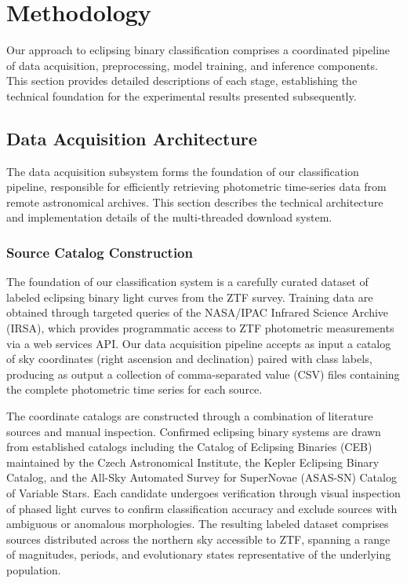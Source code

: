 \documentclass[11pt,a4paper]{article}
\begin{document}
\section{Methodology}\label{sec:methodology}

Our approach to eclipsing binary classification comprises a coordinated pipeline of data acquisition, preprocessing, model training, and inference components. This section provides detailed descriptions of each stage, establishing the technical foundation for the experimental results presented subsequently.

\subsection{Data Acquisition Architecture}

The data acquisition subsystem forms the foundation of our classification pipeline, responsible for efficiently retrieving photometric time-series data from remote astronomical archives. This section describes the technical architecture and implementation details of the multi-threaded download system.

\subsubsection{Source Catalog Construction}

The foundation of our classification system is a carefully curated dataset of labeled eclipsing binary light curves from the ZTF survey. Training data are obtained through targeted queries of the NASA/IPAC Infrared Science Archive (IRSA), which provides programmatic access to ZTF photometric measurements via a web services API. Our data acquisition pipeline accepts as input a catalog of sky coordinates (right ascension and declination) paired with class labels, producing as output a collection of comma-separated value (CSV) files containing the complete photometric time series for each source.

The coordinate catalogs are constructed through a combination of literature sources and manual inspection. Confirmed eclipsing binary systems are drawn from established catalogs including the Catalog of Eclipsing Binaries (CEB) maintained by the Czech Astronomical Institute, the Kepler Eclipsing Binary Catalog, and the All-Sky Automated Survey for SuperNovae (ASAS-SN) Catalog of Variable Stars. Each candidate undergoes verification through visual inspection of phased light curves to confirm classification accuracy and exclude sources with ambiguous or anomalous morphologies. The resulting labeled dataset comprises sources distributed across the northern sky accessible to ZTF, spanning a range of magnitudes, periods, and evolutionary states representative of the underlying population.
\end{document}
